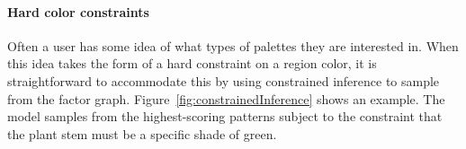
\paragraph{Hard color constraints} Often a user has some idea of what types of palettes they are interested in. When this idea takes the form of a hard constraint on a region color, it is straightforward to accommodate this by using constrained inference to sample from the factor graph. Figure~\ref{fig:constrainedInference} shows an example. The model samples from the highest-scoring patterns subject to the constraint that the plant stem must be a specific shade of green.

